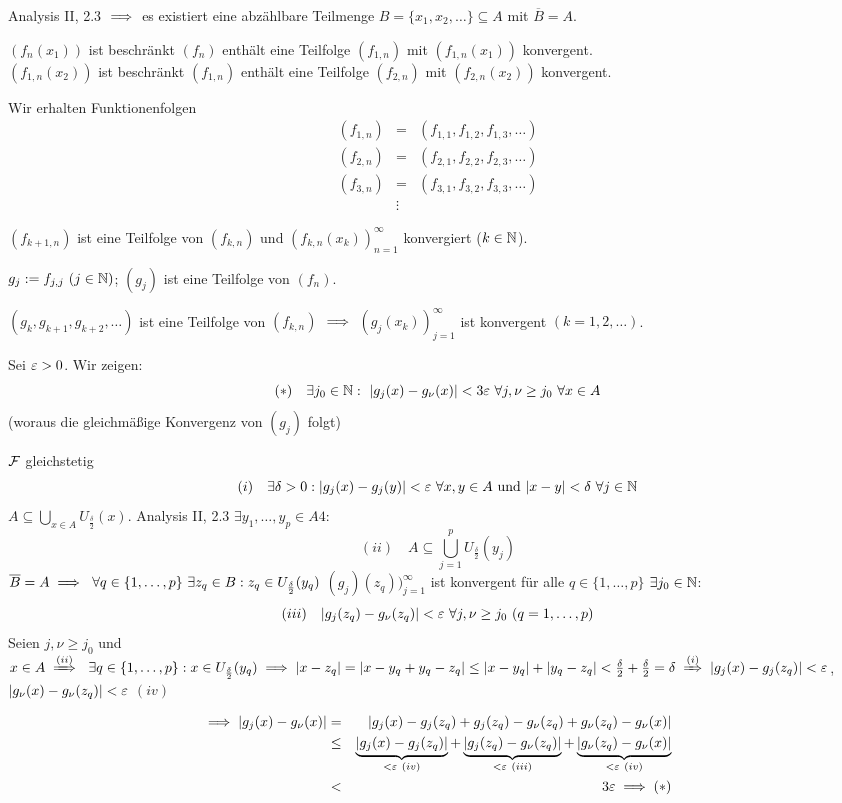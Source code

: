\documentclass{article}
\begin{document}
\begin{beweis}
Analysis II, 2.3 $\implies$ es existiert eine abzählbare Teilmenge $B=\{x_1,x_2,\ldots\} \subseteq A$ mit $\overline{B} = A$.

$(f_n(x_1))$ ist beschränkt  $(f_n)$ enthält eine Teilfolge $(f_{1,n})$ mit $(f_{1,n}(x_1))$ konvergent.\\
$(f_{1,n}(x_2))$ ist beschränkt  $(f_{1,n})$ enthält eine Teilfolge $(f_{2,n})$ mit $(f_{2,n}(x_2))$ konvergent.

Wir erhalten Funktionenfolgen
\begin{eqnarray*}
(f_{1,n}) &=& (f_{1,1},f_{1,2},f_{1,3},\ldots)  \\
(f_{2,n}) &=& (f_{2,1},f_{2,2},f_{2,3},\ldots)  \\
(f_{3,n}) &=& (f_{3,1},f_{3,2},f_{3,3},\ldots)   \\
& \vdots &
\end{eqnarray*}

$(f_{k+1,n})$ ist eine Teilfolge von $(f_{k,n})$ und $(f_{k,n}(x_k))_{n=1}^\infty$ konvergiert ($k\in\mathbb{N}$).

$g_j := f_{j,j}\ (j\in\mathbb{N})$; $(g_j)$ ist eine Teilfolge von $(f_n)$.

$(g_k, g_{k+1}, g_{k+2}, \ldots)$ ist eine Teilfolge von $(f_{k,n})$ $\implies$ $(g_j(x_k))_{j=1}^\infty$ ist konvergent $(k=1,2,\ldots)$.

Sei $\varepsilon > 0$. Wir zeigen: 
\[(*)\quad \exists j_0\in\mathbb{N}:\ |g_j(x) - g_\nu(x)| < 3\varepsilon \ \forall j,\nu \ge j_0\ \forall x\in A\] 
(woraus die gleichmäßige Konvergenz von $(g_j)$ folgt)

$\mathcal{F}$ gleichstetig \folgt 
\[ (i) \quad \exists \delta >0: |g_j(x)-g_j(y)| < \varepsilon \ \forall x,y\in A\text{ und }|x-y| <\delta\ \forall j\in\mathbb{N}\]
$A\subseteq \bigcup_{x\in A} U_{\frac\delta2}(x)$. Analysis II, 2.3 \folgt $\exists y_1,\ldots,y_p \in A4$:
\[ (ii) \quad A \subseteq \bigcup_{j=1}^p U_{\frac\delta2}(y_j) \]
$\overline{B} = A \implies \ \forall q\in\{1,\ldots,p\} \ \exists z_q \in B: z_q \in U_{\frac\delta2}(y_q)$
$(g_j)(z_q))_{j=1}^\infty$ ist konvergent für alle $q\in\{1,\ldots,p\}$ \folgt $\exists j_0\in\mathbb{N}$:
\[ (iii)\quad | g_j(z_q) - g_\nu(z_q) | < \ep \ \forall j,\nu \ge j_0 \ (q=1,\ldots,p)\]
Seien $j,\nu \ge j_0$ und $x\in A \folgtwegen{(ii)} \ \exists q\in\{1,\ldots,p\}: x\in U_{\frac\delta2}(y_q) \folgt |x-z_q| = |x-y_q+y_q-z_q| \le |x-y_q| + |y_q-z_q| < \frac{\delta}2 + \frac\delta2 = \delta \folgtwegen{(i)} |g_j(x) - g_j(z_q)| < \ep$, $|g_\nu (x) - g_\nu (z_q)|<\varepsilon$ $(iv)$

\begin{eqnarray*}
\implies |g_j(x)-g_\nu(x)| &=& |g_j(x)-g_j(z_q) + g_j(z_q) - g_\nu(z_q) + g_\nu(z_q)-g_\nu(x)| \\
&\le& \underbrace{|g_j(x) - g_j(z_q)|}_{< \varepsilon\ (iv)} + \underbrace{|g_j(z_q) - g_\nu(z_q)|}_{< \varepsilon\ (iii)} + \underbrace{|g_\nu(z_q) - g_\nu(x)|}_{< \varepsilon\ (iv)}\\
&<& 3 \varepsilon \implies (*)
\end{eqnarray*}
\
 
\end{beweis}
\end{document}
